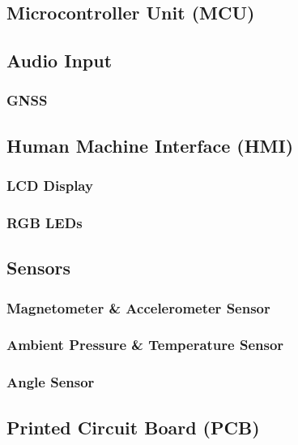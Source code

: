 \subsection{Microcontroller Unit (MCU)}


\subsection{Audio Input}

\subsubsection{GNSS}

\subsection{Human Machine Interface (HMI)}


\subsubsection{LCD Display}

\subsubsection{RGB LEDs}

\subsection{Sensors}

\subsubsection{Magnetometer \& Accelerometer Sensor}

\subsubsection{Ambient Pressure \& Temperature Sensor}

\subsubsection{Angle Sensor}

\subsection{Printed Circuit Board (PCB)}

